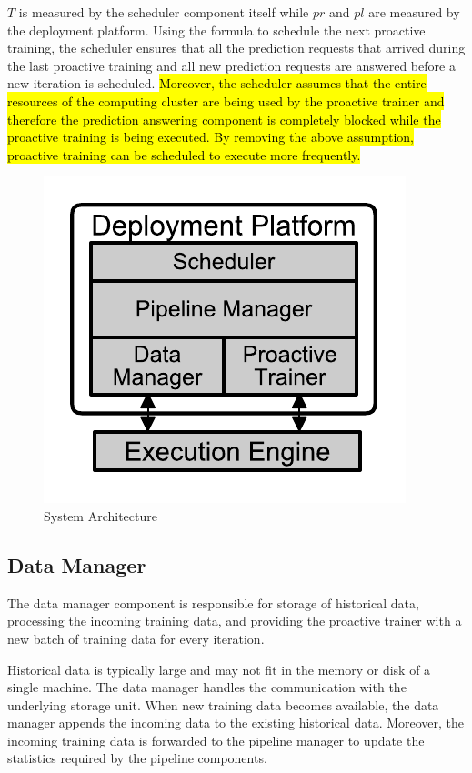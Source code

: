 $T$ is measured by the scheduler component itself while $pr$ and $pl$ are measured by the deployment platform.
Using the formula to schedule the next proactive training, the scheduler ensures that all the prediction requests that arrived during the last proactive training and all new prediction requests are answered before a new iteration is scheduled.
\hl{Moreover, the scheduler assumes that the entire resources of the computing cluster are being used by the proactive trainer and therefore the prediction answering component is completely blocked while the proactive training is being executed.
By removing the above assumption, proactive training can be scheduled to execute more frequently.}
\begin{figure}[h]
\centering
\includegraphics[width=0.8\columnwidth]{../images/system-architecture.pdf}
\caption{System Architecture}
\label{fig:system-architecture}
\end{figure}


\subsection{Data Manager} \label{data-manager}
The data manager component is responsible for storage of historical data, processing the incoming training data, and providing the proactive trainer with a new batch of training data for every iteration.

Historical data is typically large and may not fit in the memory or disk of a single machine. 
The data manager handles the communication with the underlying storage unit.
When new training data becomes available, the data manager appends the incoming data to the existing historical data.
Moreover, the incoming training data is forwarded to the pipeline manager to update the statistics required by the pipeline components.

